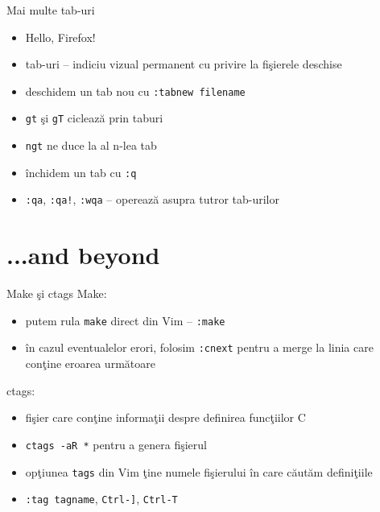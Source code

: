 \documentclass{beamer}
\begin{document}
\begin{frame}{Mai multe tab-uri}
\begin{itemize}
  \item<1-> Hello, Firefox!
  \item<2-> tab-uri -- indiciu vizual permanent cu privire la fişierele deschise
  \item<3-> deschidem un tab nou cu \texttt{:tabnew filename}
  \item<4-> \texttt{gt} şi \texttt{gT} ciclează prin taburi
  \item<5-> \texttt{ngt} ne duce la al n-lea tab
  \item<6-> închidem un tab cu \texttt{:q}
  \item<7-> \texttt{:qa}, \texttt{:qa!}, \texttt{:wqa} -- operează asupra
  tutror tab-urilor
\end{itemize}
\end{frame}

\section{...and beyond}
\frame{\tableofcontents[currentsection]}

\begin{frame}{Make şi ctags}
Make:
\begin{itemize}
  \item<1-> putem rula \texttt{make} direct din Vim -- \texttt{:make}
  \item<2-> în cazul eventualelor erori, folosim \texttt{:cnext} pentru a
  merge la linia care conţine eroarea următoare
\end{itemize}

 ctags:
\begin{itemize}
  \item<4-> fişier care conţine informaţii despre definirea funcţiilor C
  \item<5-> \texttt{ctags -aR *} pentru a genera fişierul
  \item<6-> opţiunea \texttt{tags} din Vim ţine numele fişierului în care
  căutăm definiţiile
  \item<7-> \texttt{:tag tagname}, \texttt{Ctrl-]}, \texttt{Ctrl-T}
\end{itemize}
\end{frame}
\end{document}
